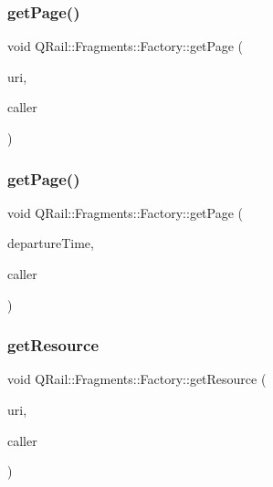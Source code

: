 \subsubsection{\texorpdfstring{getPage()}{getPage()}\hspace{0.1cm}{\footnotesize\ttfamily [1/2]}}
{\footnotesize\ttfamily void Q\+Rail\+::\+Fragments\+::\+Factory\+::get\+Page (\begin{DoxyParamCaption}\item[{const Q\+Url \&}]{uri,  }\item[{Q\+Object $\ast$}]{caller }\end{DoxyParamCaption})}

\mbox{\label{classQRail_1_1Fragments_1_1Factory_a9a1ad3f27d325db60b7221fe4124353a}} 
\subsubsection{\texorpdfstring{getPage()}{getPage()}\hspace{0.1cm}{\footnotesize\ttfamily [2/2]}}
{\footnotesize\ttfamily void Q\+Rail\+::\+Fragments\+::\+Factory\+::get\+Page (\begin{DoxyParamCaption}\item[{const Q\+Date\+Time \&}]{departure\+Time,  }\item[{Q\+Object $\ast$}]{caller }\end{DoxyParamCaption})}

\mbox{\label{classQRail_1_1Fragments_1_1Factory_aea317c8efb3b0edfcd937935293b5988}} 
\subsubsection{\texorpdfstring{getResource}{getResource}}
{\footnotesize\ttfamily void Q\+Rail\+::\+Fragments\+::\+Factory\+::get\+Resource (\begin{DoxyParamCaption}\item[{const Q\+Url \&}]{uri,  }\item[{Q\+Object $\ast$}]{caller }\end{DoxyParamCaption})\hspace{0.3cm}{\ttfamily [signal]}}

